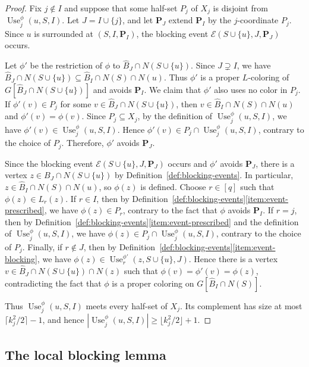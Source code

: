 \documentclass[12pt]{article}
\numberwithin{equation}{section}
\theoremstyle{definition}
\newcommand{\Use}{\operatorname{Use}}
\begin{document}
\begin{proof}
Fix $j \notin I$ and suppose that some half-set $P_j$ of $X_j$ is disjoint
from $\Use_j^\phi(u, S, I)$. Let $J = I \cup \{j\}$, and let $\mathbf{P}_J$
extend $\mathbf{P}_I$ by the $j$-coordinate $P_j$.
Since $u$ is surrounded at $(S,I,\mathbf{P}_I)$, the blocking event
$\mathcal{E}(S \cup \{u\},J,\mathbf{P}_J)$ occurs.

Let $\phi'$ be the restriction
of $\phi$ to $\hat{B}_{J} \cap N(S \cup \{u\})$. Since $J \supsetneq I$, we have
$\hat{B}_{J} \cap N(S \cup \{u\})
 \subseteq \hat{B}_{I} \cap N(S) \cap N(u)$. Thus $\phi'$ is a proper
$L$-coloring of $G[\hat{B}_{J} \cap N(S \cup \{u\})]$ and avoids
$\mathbf{P}_I$. We claim that $\phi'$ also uses no color in $P_j$. If
$\phi'(v) \in P_j$ for some
$v \in \hat{B}_{J} \cap N(S \cup \{u\})$, then
$v \in \hat{B}_{I} \cap N(S) \cap N(u)$ and $\phi'(v) = \phi(v)$. Since
$P_j \subseteq X_j$, by the definition of $\Use_j^\phi(u, S, I)$, we have
$\phi'(v) \in \Use_j^\phi(u, S, I)$. Hence
$\phi'(v) \in P_j \cap \Use_j^\phi(u, S, I)$, contrary to the choice of $P_j$.
Therefore, $\phi'$ avoids $\mathbf{P}_J$.

Since the blocking event $\mathcal{E}(S \cup \{u\},J,\mathbf{P}_J)$ occurs and
$\phi'$ avoids $\mathbf{P}_J$, there is a vertex
$z \in B_J \cap N(S \cup \{u\})$ by
Definition~\ref{def:blocking-events}. In particular,
$z \in \hat{B}_{I} \cap N(S) \cap N(u)$, so $\phi(z)$ is defined. Choose
$r \in [q]$ such that $\phi(z) \in L_r(z)$. If $r \in I$, then by
Definition~\ref{def:blocking-events}\ref{item:event-prescribed}, we have
$\phi(z) \in P_r$, contrary to the fact that $\phi$ avoids $\mathbf{P}_I$.
If $r = j$, then by
Definition~\ref{def:blocking-events}\ref{item:event-prescribed} and the definition of
$\Use_j^\phi(u, S, I)$, we have
$\phi(z) \in P_j \cap \Use_j^\phi(u, S, I)$, contrary to the choice of $P_j$.
Finally, if $r \notin J$, then by
Definition~\ref{def:blocking-events}\ref{item:event-blocking}, we have
$\phi(z) \in \Use_r^{\phi'}(z, S \cup \{u\}, J)$. Hence there is a vertex
$v \in \hat{B}_{J} \cap N(S \cup \{u\}) \cap N(z)$ such that
$\phi(v) = \phi'(v) = \phi(z)$, contradicting the fact that $\phi$ is a proper coloring on $G[\hat{B}_{I} \cap N(S)]$.

Thus $\Use_j^\phi(u, S, I)$ meets every
half-set of $X_j$. Its complement has size at most
$\lceil k_j^2/2\rceil - 1$, and hence
$|\Use_j^\phi(u, S, I)| \geq \lfloor k_j^2/2\rfloor + 1$.
\end{proof}
 

\subsection{The local blocking lemma}\label{subsec:local-blocking}
\end{document}
